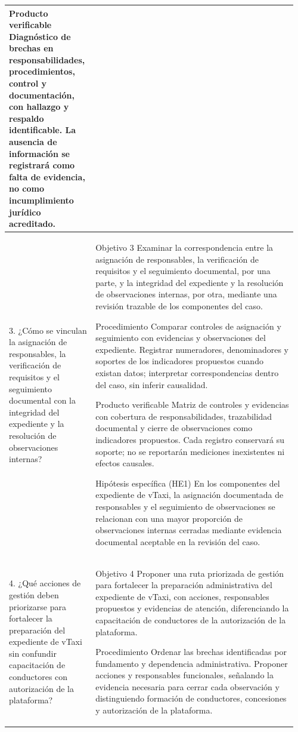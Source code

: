 {\begin{landscape}
\begin{longtable}{@{}p{0.28\linewidth}p{0.68\linewidth}@{}}
Producto verificable
Diagnóstico de brechas en responsabilidades, procedimientos, control y documentación, con hallazgo y respaldo identificable. La ausencia de información se registrará como falta de evidencia, no como incumplimiento jurídico acreditado.\\
\midrule
3. ¿Cómo se vinculan la asignación de responsables, la verificación de requisitos y el seguimiento documental con la integridad del expediente y la resolución de observaciones internas? & Objetivo 3
Examinar la correspondencia entre la asignación de responsables, la verificación de requisitos y el seguimiento documental, por una parte, y la integridad del expediente y la resolución de observaciones internas, por otra, mediante una revisión trazable de los componentes del caso.

Procedimiento
Comparar controles de asignación y seguimiento con evidencias y observaciones del expediente. Registrar numeradores, denominadores y soportes de los indicadores propuestos cuando existan datos; interpretar correspondencias dentro del caso, sin inferir causalidad.

Producto verificable
Matriz de controles y evidencias con cobertura de responsabilidades, trazabilidad documental y cierre de observaciones como indicadores propuestos. Cada registro conservará su soporte; no se reportarán mediciones inexistentes ni efectos causales.\par Hipótesis específica (HE1)
En los componentes del expediente de vTaxi, la asignación documentada de responsables y el seguimiento de observaciones se relacionan con una mayor proporción de observaciones internas cerradas mediante evidencia documental aceptable en la revisión del caso.\\
\midrule
4. ¿Qué acciones de gestión deben priorizarse para fortalecer la preparación del expediente de vTaxi sin confundir capacitación de conductores con autorización de la plataforma? & Objetivo 4
Proponer una ruta priorizada de gestión para fortalecer la preparación administrativa del expediente de vTaxi, con acciones, responsables propuestos y evidencias de atención, diferenciando la capacitación de conductores de la autorización de la plataforma.

Procedimiento
Ordenar las brechas identificadas por fundamento y dependencia administrativa. Proponer acciones y responsables funcionales, señalando la evidencia necesaria para cerrar cada observación y distinguiendo formación de conductores, concesiones y autorización de la plataforma.


\end{longtable}
\end{landscape}}
